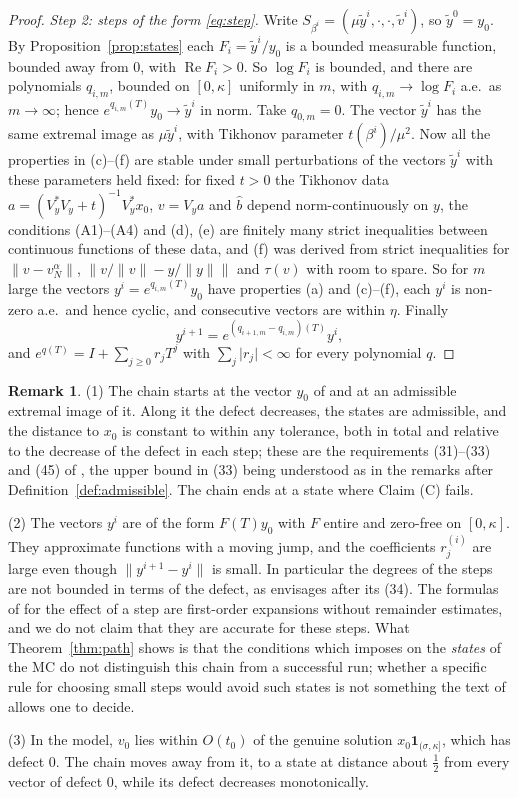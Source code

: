 \documentclass[11pt]{article}
\theoremstyle{definition}
\newtheorem{remark}[theorem]{Remark}
\newcommand{\norm}[1]{\lVert #1\rVert}
\newcommand{\abs}[1]{\lvert #1\rvert}
\newcommand{\re}{\operatorname{Re}}
\newcommand{\hb}{\hat b}
\newcommand{\one}{\mathbf 1}
\begin{document}
\begin{proof}
\emph{Step 2: steps of the form \eqref{eq:step}.} Write $S_{\beta^i}=(\mu\tilde y^i,\cdot,
\cdot,\tilde v^i)$, so $\tilde y^0=y_0$. By Proposition~\ref{prop:states} each
$F_i=\tilde y^i/y_0$ is a bounded measurable function, bounded away from $0$, with
$\re F_i>0$. So $\log F_i$ is bounded, and there are polynomials $q_{i,m}$, bounded on
$[0,\kappa]$ uniformly in $m$, with $q_{i,m}\to\log F_i$ a.e.\ as $m\to\infty$; hence
$e^{q_{i,m}(T)}y_0\to\tilde y^i$ in norm. Take $q_{0,m}=0$. The vector
$\tilde y^i$ has the same extremal image as $\mu\tilde y^i$, with Tikhonov parameter
$t(\beta^i)/\mu^2$. Now all the properties in (c)--(f)
are stable under small perturbations of the vectors $\tilde y^i$ with these parameters held
fixed: for fixed $t>0$ the Tikhonov data $a=(V_y^*V_y+t)^{-1}V_y^*x_0$, $v=V_ya$ and $\hb$
depend norm-continuously on $y$, the conditions (A1)--(A4) and (d), (e) are finitely many
strict inequalities between continuous functions of these data, and (f) was derived from
strict inequalities for $\norm{v-v_N^\alpha}$, $\norm{v/\norm v-y/\norm y}$ and $\tau(v)$
with room to spare. So for $m$ large the vectors $y^i=e^{q_{i,m}(T)}y_0$ have properties
(a) and (c)--(f), each $y^i$ is non-zero a.e.\ and hence cyclic, and consecutive vectors
are within $\eta$. Finally
\[
y^{i+1}=e^{(q_{i+1,m}-q_{i,m})(T)}y^i ,
\]
and $e^{q(T)}=I+\sum_{j\ge0}r_jT^j$ with $\sum_j\abs{r_j}<\infty$ for every polynomial $q$.
\end{proof}

\begin{remark}\label{rem:path}
(1) The chain starts at the vector $y_0$ of \cite{E} and at an admissible extremal image of
it. Along it the defect decreases, the states are admissible, and the distance to $x_0$ is
constant to within any tolerance, both in total and relative to the decrease of the defect in
each step; these are the requirements \textup{(31)--(33)} and \textup{(45)} of \cite{E}, the
upper bound in \textup{(33)} being understood as in the remarks after
Definition~\ref{def:admissible}. The chain ends at a state where Claim (C) fails.

(2) The vectors $y^i$ are of the form $F(T)y_0$ with $F$ entire and zero-free on
$[0,\kappa]$. They approximate functions with a moving jump, and the coefficients
$r^{(i)}_j$ are large even though $\norm{y^{i+1}-y^i}$ is small. In particular the
degrees of the steps are not bounded in terms of the defect, as \cite{E} envisages after its
(34). The formulas of \cite{E} for the effect of a step are first-order expansions without
remainder estimates, and we do not claim that they are accurate for these steps. What
Theorem~\ref{thm:path} shows is that the conditions which \cite{E} imposes on the
\emph{states} of the MC do not distinguish this chain from a successful run; whether a
specific rule for choosing small steps would avoid such states is not something the text of
\cite{E} allows one to decide.

(3) In the model, $v_0$ lies within $O(t_0)$ of the genuine solution
$x_0\one_{(\sigma,\kappa]}$, which has defect $0$. The chain moves away from it, to a state
at distance about $\frac12$ from every vector of defect $0$, while its defect decreases
monotonically.
\end{remark}
\end{document}
